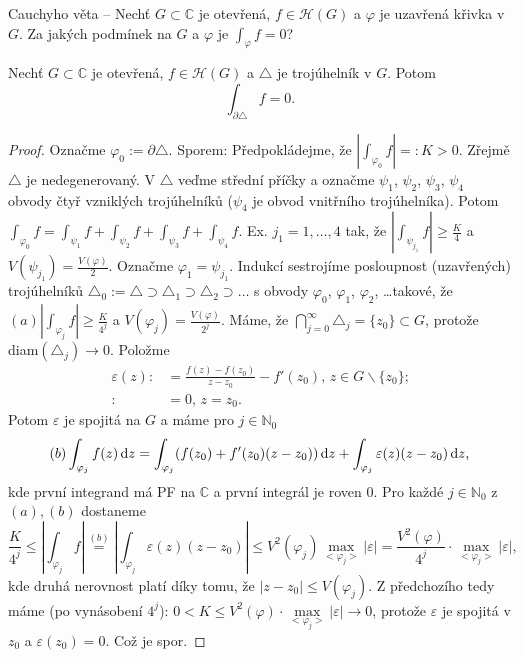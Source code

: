 \begin{note}
Cauchyho věta -- Nechť $G \subset \mathbb{C}$ je otevřená, $f \in \mathcal{H}(G)$ a $\varphi$ je uzavřená křivka v $G$. Za jakých podmínek na $G$ a $\varphi$ je $\int_\varphi f=0$?
\end{note}

\begin{theorem} %
Nechť $G \subset \mathbb{C}$ je otevřená, $f \in \mathcal{H}(G)$ a $\triangle$ je trojúhelník v $G$. Potom
\begin{equation}
    \int_{\partial\triangle}f=0\text{.}
\end{equation} 
\end{theorem}

\begin{proof}
Označme $\varphi_0:=\partial\triangle$. Sporem: Předpokládejme, že $|\int_{\varphi_0}f|=:K>0$. Zřejmě $\triangle$ je nedegenerovaný. V  $\triangle$ veďme střední příčky a označme $\psi_1$, $\psi_2$, $\psi_3$, $\psi_4$ obvody čtyř vzniklých trojúhelníků ($\psi_4$ je obvod vnitřního trojúhelníka). Potom $\int_{\varphi_0}f=\int_{\psi_1}f+\int_{\psi_2}f+\int_{\psi_3}f+\int_{\psi_4}f$. Ex. $j_1=1, \ldots, 4$ tak, že $|\int_{\psi_{j_1}}f|\ge \frac{K}{4}$ a $V({\psi_{j_1}})= \frac{V(\varphi)}{2}$.
Označme $\varphi_1=\psi_{j_1}$. Indukcí sestrojíme posloupnost (uzavřených) trojúhelníků $\triangle_0:=\triangle \supset \triangle_1 \supset \triangle_2 \supset \ldots$ s obvody $\varphi_0$, $\varphi_1$, $\varphi_2$, \ldots takové, že $(a) |\int_{\varphi_j}f|\ge \frac{K}{4^j}$ a $V({\varphi_j})= \frac{V(\varphi)}{2^j}$. Máme, že $\bigcap\limits_{j=0}^\infty \triangle_j=\{z_0\} \subset G$, protože diam$(\triangle_j)\rightarrow 0$. Položme
$$\begin{aligned}
\varepsilon(z): &= \frac{f(z)-f(z_0)}{z-z_0}-f'(z_0) \text{, } z \in G \backslash \{z_0\} \text{;} \\
: &= 0  \text{, } z=z_0 \text{.}
\end{aligned}
$$
Potom $\varepsilon$ je spojitá na $G$ a máme pro $j \in \mathbb{N}_0$
$$
(b) \int_{\varphi_j}f(z) \mathop{}\!\mathrm{d} z = \int_{\varphi_j}(f(z_0)+f'(z_0)(z-z_0)) \mathop{}\!\mathrm{d} z + \int_{\varphi_j}\varepsilon(z)(z-z_0) \mathop{}\!\mathrm{d} z \text{,}
$$
kde první integrand má PF na $\mathbb{C}$ a první integrál je roven $0$. Pro každé $j \in \mathbb{N}_0$ z $(a), (b)$ dostaneme
$$
\frac{K}{4^j} \le \left| \int_{\varphi_j}f\right|\stackrel{(b)}{=} \left|\int_{\varphi_j}\varepsilon(z)(z-z_0)\right| \le V^2(\varphi_j) \max_{<\varphi_j>}|\varepsilon|=\frac{V^2(\varphi)}{4^j}\cdot \max_{<\varphi_j>}|\varepsilon| \text{,}
$$
kde druhá nerovnost platí díky tomu, že $|z-z_0| \le V(\varphi_j)$. Z předchozího tedy máme (po vynásobení $4^j$): $0<K \le V^2(\varphi) \cdot \max\limits_{<\varphi_j>}|\varepsilon| \rightarrow 0$, protože $\varepsilon$ je spojitá v $z_0$ a $\varepsilon(z_0)=0$. Což je spor.
\end{proof}

